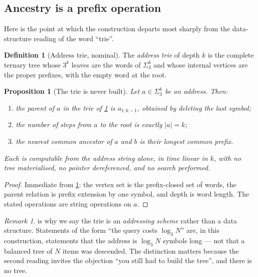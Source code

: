 \documentclass[11pt,twocolumn,a4paper]{article}
\theoremstyle{plain}
\newtheorem{proposition}[theorem]{Proposition}
\theoremstyle{definition}
\newtheorem{definition}[theorem]{Definition}
\theoremstyle{remark}
\newtheorem{remark}[theorem]{Remark}
\newcommand{\Trits}{\Sigma_3}
\begin{document}
\subsection{Ancestry is a prefix operation}

Here is the point at which the construction departs most sharply from the
data-structure reading of the word ``trie''.

\begin{definition}[Address trie, nominal]
\label{def:trie}
The \emph{address trie} of depth $k$ is the complete ternary tree whose
$3^{k}$ leaves are the words of $\Trits^{k}$ and whose internal vertices are the
proper prefixes, with the empty word at the root.
\end{definition}

\begin{proposition}[The trie is never built]
\label{prop:notree}
Let $a \in \Trits^k$ be an address. Then:
\begin{enumerate}[label=(\roman*),leftmargin=2.2em]
\item the parent of $a$ in the trie of \cref{def:trie} is $a_{1:k-1}$, obtained
by deleting the last symbol;
\item the number of steps from $a$ to the root is exactly $|a| = k$;
\item the nearest common ancestor of $a$ and $b$ is their longest common
prefix.
\end{enumerate}
Each is computable from the address string alone, in time linear in $k$, with no
tree materialised, no pointer dereferenced, and no search performed.
\end{proposition}

\begin{proof}
Immediate from \cref{def:trie}: the vertex set is the prefix-closed set of words,
the parent relation is prefix extension by one symbol, and depth is word length.
The stated operations are string operations on $a$.
\end{proof}

\begin{remark}
 is why we say the trie is an \emph{addressing scheme} rather
than a data structure. Statements of the form ``the query costs $\log_3 N$''
are, in this construction, statements that the address is $\log_3 N$ symbols
long --- not that a balanced tree of $N$ items was descended. The distinction
matters because the second reading invites the objection ``you still had to
build the tree'', and there is no tree.
\end{remark}
\end{document}
